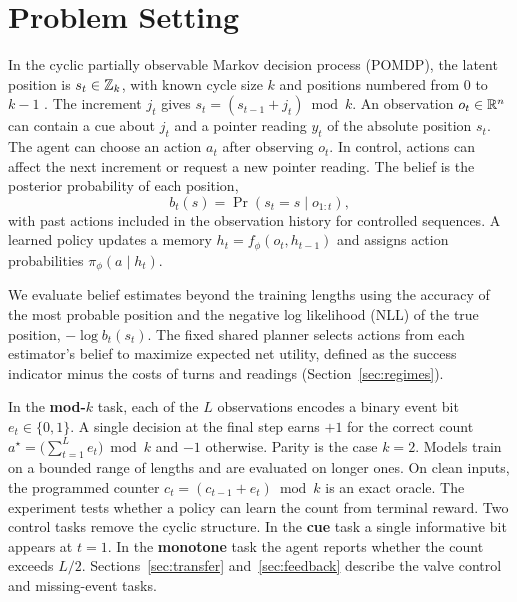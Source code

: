 \section{Problem Setting}\label{sec:setting}
\label{sec:prelim}
\label{sec:problem}

In the cyclic partially observable Markov decision process (POMDP), the latent
position is $s_t\in\mathbb{Z}_k$, with known cycle size $k$ and positions numbered from
$0$ to $k-1$ \citep{kaelbling1998pomdp}. The increment $j_t$ gives
$s_t=(s_{t-1}+j_t)\bmod k$. An observation $o_t\in\mathbb{R}^n$ can contain a cue about
$j_t$ and a pointer reading $y_t$ of the absolute position $s_t$. The agent can
choose an action $a_t$ after observing $o_t$. In control, actions can affect the
next increment or request a new pointer reading. The belief is the posterior
probability of each position,
\[
b_t(s)=\Pr(s_t=s\mid o_{1:t}),
\]
with past actions included in the observation history for controlled sequences.
A learned policy updates a memory $h_t=f_\phi(o_t,h_{t-1})$ and assigns action
probabilities $\pi_\phi(a\mid h_t)$.

We evaluate belief estimates beyond the training lengths using the accuracy of
the most probable position and the negative log likelihood (NLL) of the true
position, $-\log b_t(s_t)$. The fixed shared planner selects actions from each
estimator's belief to maximize expected net utility, defined as the success
indicator minus the costs of turns and readings
(Section~\ref{sec:regimes}).

In the \textbf{mod-$k$} task, each of the $L$ observations encodes a binary event
bit $e_t\in\{0,1\}$. A single decision at the final step earns $+1$ for the
correct count $a^\star=\big(\sum_{t=1}^{L} e_t\big)\bmod k$ and $-1$ otherwise.
Parity is the case $k=2$. Models train on a bounded range of lengths and are
evaluated on longer ones. On clean inputs, the programmed counter
$c_t=(c_{t-1}+e_t)\bmod k$ is an exact oracle. The experiment tests whether a
policy can learn the count from terminal reward. Two control tasks remove the
cyclic structure. In the \textbf{cue} task a single informative bit appears at
$t=1$. In the \textbf{monotone} task the agent reports whether the count exceeds
$L/2$. Sections~\ref{sec:transfer} and~\ref{sec:feedback} describe the valve
control and missing-event tasks.
